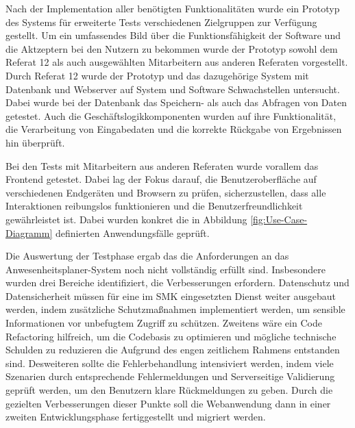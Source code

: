 Nach der Implementation aller benötigten Funktionalitäten wurde ein Prototyp des Systems für erweiterte Tests verschiedenen Zielgruppen zur Verfügung gestellt. Um ein umfassendes Bild über die Funktionsfähigkeit der Software und die Aktzeptern bei den Nutzern zu bekommen wurde der Prototyp sowohl dem Referat 12 als auch ausgewählten Mitarbeitern aus anderen Referaten vorgestellt. Durch Referat 12 wurde der Prototyp und das dazugehörige System mit Datenbank und Webserver auf System und Software Schwachstellen untersucht. Dabei wurde bei der Datenbank das Speichern- als auch das Abfragen von Daten getestet. Auch die Geschäftslogikkomponenten wurden auf ihre Funktionalität, die Verarbeitung von Eingabedaten und die korrekte Rückgabe von Ergebnissen hin überprüft.

Bei den Tests mit Mitarbeitern aus anderen Referaten wurde vorallem das Frontend getestet. Dabei lag der Fokus darauf, die Benutzeroberfläche auf verschiedenen Endgeräten und Browsern zu prüfen, sicherzustellen, dass alle Interaktionen reibungslos funktionieren und die Benutzerfreundlichkeit gewährleistet ist. Dabei wurden konkret die in Abbildung \ref{fig:Use-Case-Diagramm} definierten Anwendungsfälle geprüft.

Die Auswertung der Testphase ergab das die Anforderungen an das Anwesenheitsplaner-System noch nicht vollständig erfüllt sind. Insbesondere wurden drei Bereiche identifiziert, die Verbesserungen erfordern. Datenschutz und Datensicherheit müssen für eine im SMK eingesetzten Dienst weiter ausgebaut werden, indem zusätzliche Schutzmaßnahmen implementiert werden, um sensible Informationen vor unbefugtem Zugriff zu schützen. Zweitens wäre ein Code Refactoring hilfreich, um die Codebasis zu optimieren und mögliche technische Schulden zu reduzieren die Aufgrund des engen zeitlichem Rahmens entstanden sind. Desweiteren sollte die Fehlerbehandlung intensiviert werden, indem viele Szenarien durch entsprechende Fehlermeldungen und Serverseitige Validierung geprüft werden, um den Benutzern klare Rückmeldungen zu geben. Durch die gezielten Verbesserungen dieser Punkte soll die Webanwendung dann in einer zweiten Entwicklungsphase fertiggestellt und migriert werden.
